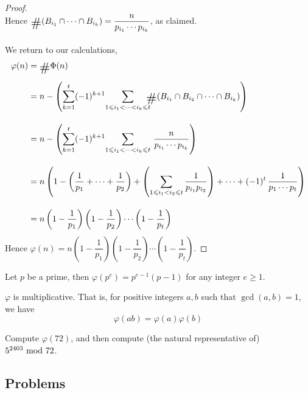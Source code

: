 \begin{proof}
\\
Hence $\card\!\left(B_{i_1} \cap \cdots \cap B_{i_k}\right) = \dfrac{n}{p_{i_1}\cdots p_{i_k}}$, as claimed.\\
\\
We return to our calculations,
\begin{align*}
\varphi(n) &= \card\Phi(n)\\[0.5em]
&= n - \left(\sum_{k = 1}^t (-1)^{k+1}{\sum_{1\leq i_1 < \cdots < i_k \leq t}}\!\!\! \card\!\left(B_{i_1} \cap B_{i_2} \cap \cdots \cap B_{i_k}\right)\right)\\[1em]
&= n - \left(\sum_{k = 1}^t (-1)^{k+1}{\sum_{1\leq i_1 < \cdots < i_k \leq t}}\ \frac{n}{p_{i_1}\cdots  p_{i_k}}\right)\\[1em]
&= n\left(1 - \left(\frac{1}{p_1} + \cdots + \frac{1}{p_2} \right) + \left(\sum_{1 \leq i_1 < i_2 \leq t}\frac{1}{p_{i_1}p_{i_2}}\right) + \cdots + (-1)^t\,\frac{1}{p_1\cdots p_t} \right)\\[1em]
&= n\left(1 - \frac{1}{p_1}\right)\left(1 - \frac{1}{p_2}\right)\cdots\left(1 - \frac{1}{p_t}\right)\\[0.1em]
\end{align*}
Hence $\varphi(n) = n\left(1 - \dfrac{1}{p_1}\right)\left(1 - \dfrac{1}{p_2}\right)\cdots\left(1 - \dfrac{1}{p_t}\right)$.
\end{proof}

\vspace*{1.5em}

\begin{corollary}
Let $p$ be a prime, then $\varphi(p^e) = p^{e-1}(p-1)$ for any integer $e \geq 1$.
\end{corollary}

\vspace*{1em}

\begin{corollary}
$\varphi$ is multiplicative. That is, for positive integers $a,b$ such that $\gcd(a,b) = 1$, we have
\[\varphi(ab) = \varphi(a)\varphi(b)\]
\end{corollary}


\begin{example}[in-class]
Compute $\varphi(72)$, and then compute (the natural representative of) $5^{2403}\text{ mod }{72}$.
\end{example}

\vspace*{0.5in}

\subsection{Problems}
\vspace{0.1in}

